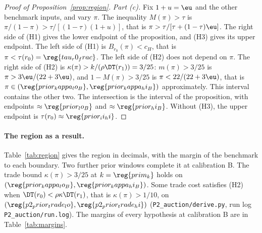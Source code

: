 \begin{proof}[Proof of Proposition~\ref{prop:region}]
\emph{Part (c).} Fix \(1+u=\eu\) and the other benchmark inputs, and vary \(\pi\). The inequality \(M(\pi)>\tau\) is
\(\pi/(1-\pi)>\tau/[(1-\tau)(1+u)]\), that is \(\pi>\tau/[\tau+(1-\tau)\eu]\). The right side of (H1) gives the
lower endpoint of the proposition, and (H3) gives its upper endpoint. The left side of (H1) is
\(B_{r_0}(\pi)<c_H\), that is \(\pi<\tau(r_0)=\reg{tau_r0_frac}\). The left side of (H2) does not depend on \(\pi\).
The right side of (H2) is \(\kappa(\pi)>k/(\rho\DT(r_1))=3/25\): \(m(\pi)>3/25\) is \(\pi>3\eu/(22+3\eu)\), and
\(1-M(\pi)>3/25\) is \(\pi<22/(22+3\eu)\), that is \(\pi\in(\reg{prior_kappa_lo_B},\reg{prior_kappa_hi_B})\)
approximately. This interval contains the other two. The intersection is the interval of the proposition, with
endpoints \(\approx\reg{prior_lo_B}\) and \(\approx\reg{prior_hi_B}\). Without (H3), the upper endpoint is
\(\tau(r_0)\approx\reg{prior_ii_hi}\).
\end{proof}

\paragraph{The region as a result.}
Table~\ref{tab:region} gives the region in decimals, with the margin of the benchmark to each boundary. Two further
prior windows complete it at calibration B. The trade bound \(\kappa(\pi)>3/25\) at \(k=\reg{prim_k}\) holds on
\((\reg{prior_kappa_lo_B},\reg{prior_kappa_hi_B})\). Some trade cost satisfies (H2) when
\(\DT(r_0)<\rho\kappa\DT(r_1)\), that is \(\kappa(\pi)>1/10\), on \((\reg{p2_prior_trade_lo},\reg{p2_prior_trade_hi})\)
(\nolinkurl{P2_auction/derive.py}, run log
\nolinkurl{P2_auction/run.log}). The margins of every hypothesis at
calibration B are in Table~\ref{tab:margins}.
